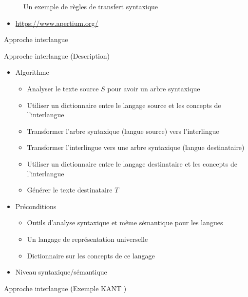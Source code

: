 \documentclass{KodeBook}
\begin{document}
\begin{figure}
	\centering
	\caption{Un exemple de règles de transfert syntaxique \cite{06-quah}}
\end{figure}

\begin{itemize}
	\item \url{https://www.apertium.org/}
\end{itemize}


Approche interlangue


Approche interlangue (Description)

\begin{itemize}
	\item Algorithme
	\begin{itemize}
		\item Analyser le texte source $S$ pour avoir un arbre syntaxique
		\item Utiliser un dictionnaire entre le langage source et les concepts de l'interlangue 
		\item Transformer l'arbre syntaxique (langue source) vers l'interlingue
		\item Transformer l'interlingue vers une arbre syntaxique (langue destinataire)
		\item Utiliser un dictionnaire entre le langage destinataire et les concepts de l'interlangue 
		\item Générer le texte destinataire $T$
	\end{itemize}
	\item Préconditions 
	\begin{itemize}
		\item Outils d'analyse syntaxique et même sémantique  pour les langues
		\item Un langage de représentation universelle
		\item Dictionnaire sur les concepts de ce langage
	\end{itemize}
	\item Niveau syntaxique/sémantique
\end{itemize}

 Approche interlangue (Exemple KANT \cite{98-czuba-al})
 
\end{document}
